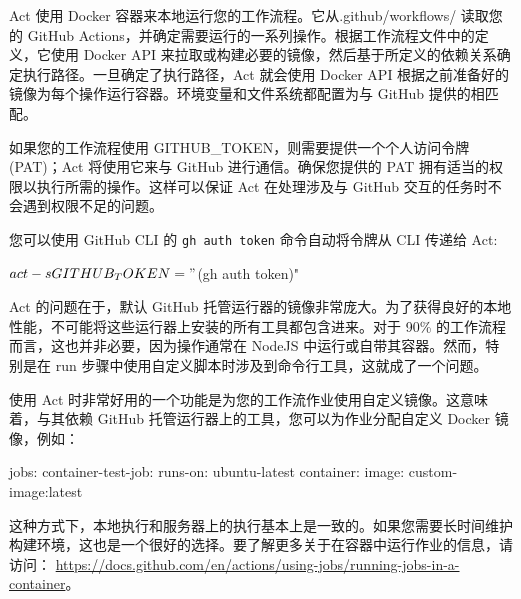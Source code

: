 
Act 使用 Docker 容器来本地运行您的工作流程。它从.github/workflows/ 读取您的 GitHub Actions，并确定需要运行的一系列操作。根据工作流程文件中的定义，它使用 Docker API 来拉取或构建必要的镜像，然后基于所定义的依赖关系确定执行路径。一旦确定了执行路径，Act 就会使用 Docker API 根据之前准备好的镜像为每个操作运行容器。环境变量和文件系统都配置为与 GitHub 提供的相匹配。

如果您的工作流程使用 GITHUB\_TOKEN，则需要提供一个个人访问令牌(PAT)；Act 将使用它来与 GitHub 进行通信。确保您提供的 PAT 拥有适当的权限以执行所需的操作。这样可以保证 Act 在处理涉及与 GitHub 交互的任务时不会遇到权限不足的问题。


您可以使用 GitHub CLI 的 \verb|gh auth token| 命令自动将令牌从 CLI 传递给 Act:

\begin{shell}
$ act -s GITHUB_TOKEN="$(gh auth token)"
\end{shell}


Act 的问题在于，默认 GitHub 托管运行器的镜像非常庞大。为了获得良好的本地性能，不可能将这些运行器上安装的所有工具都包含进来。对于 90\% 的工作流程而言，这也并非必要，因为操作通常在 NodeJS 中运行或自带其容器。然而，特别是在 run 步骤中使用自定义脚本时涉及到命令行工具，这就成了一个问题。

使用 Act 时非常好用的一个功能是为您的工作流作业使用自定义镜像。这意味着，与其依赖 GitHub 托管运行器上的工具，您可以为作业分配自定义 Docker 镜像，例如：

\begin{shell}
jobs:
  container-test-job:
    runs-on: ubuntu-latest
    container:
      image: custom-image:latest
\end{shell}

这种方式下，本地执行和服务器上的执行基本上是一致的。如果您需要长时间维护构建环境，这也是一个很好的选择。要了解更多关于在容器中运行作业的信息，请访问： \url{https://docs.github.com/en/actions/using-jobs/running-jobs-in-a-container}。
